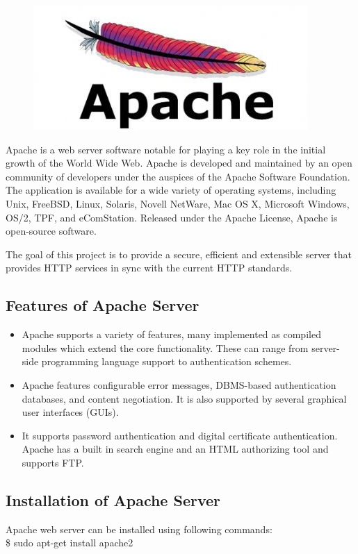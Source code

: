 \begin{figure}[h]
\centering\includegraphics[scale=0.5]{images/apache.jpg}
\end{figure}
\noindent Apache is a web server software notable for playing a key role in the initial 
growth of the World Wide Web. Apache is developed and maintained by an 
open community of developers under the auspices of the Apache Software 
Foundation. The application is available for a wide variety of operating 
systems, including Unix, FreeBSD, Linux, Solaris, Novell NetWare, Mac OS X, 
Microsoft Windows, OS/2, TPF, and eComStation. Released under the Apache 
License, Apache is open-source software.

The goal of this project is to provide a secure, efficient and extensible 
server that provides HTTP services in sync with the current HTTP standards.
\subsection{Features of Apache Server}
\begin{itemize}
\item Apache supports a variety of features, many implemented as compiled 
modules which extend the core functionality. These can range from 
server-side programming language support to authentication schemes. 
\item Apache features configurable error messages, DBMS-based 
authentication databases, and content negotiation. It is also supported 
by several graphical user interfaces (GUIs).
\item It supports password authentication and digital certificate 
authentication. Apache has a built in search engine and an HTML authorizing 
tool and supports FTP.
\end{itemize}

\subsection{Installation of Apache Server}
Apache web server can be installed using following commands:\\

\hspace{4pt} \$ sudo apt-get install apache2
\newpage
